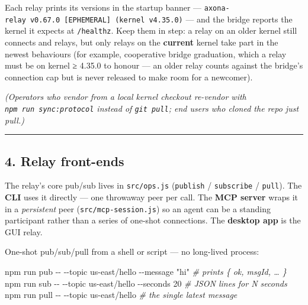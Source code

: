 \documentclass[
  nobib]{tufte-handout}
\newenvironment{Shaded}{}{}
\newcommand{\AttributeTok}[1]{\textcolor[rgb]{0.49,0.56,0.16}{#1}}
\newcommand{\CommentTok}[1]{\textcolor[rgb]{0.38,0.63,0.69}{\textit{#1}}}
\newcommand{\ExtensionTok}[1]{#1}
\newcommand{\NormalTok}[1]{#1}
\newcommand{\StringTok}[1]{\textcolor[rgb]{0.25,0.44,0.63}{#1}}
\renewcommand{\subsubsection}[1]{\medskip\par\noindent{\normalsize\bfseries #1}\par\nobreak\smallskip}
\begin{document}
Each relay prints its versions in the startup banner ---
\texttt{axona-relay\ v0.67.0\ {[}EPHEMERAL{]}\ (kernel\ v4.35.0)} ---
and the bridge reports the kernel it expects at \texttt{/healthz}. Keep
them in step: a relay on an older kernel still connects and relays, but
only relays on the \textbf{current} kernel take part in the newest
behaviours (for example, cooperative bridge graduation, which a relay
must be on kernel ≥ 4.35.0 to honour --- an older relay counts against
the bridge's connection cap but is never released to make room for a
newcomer).

\emph{(Operators who vendor from a local kernel checkout re-vendor with
\texttt{npm\ run\ sync:protocol} instead of \texttt{git\ pull}; end
users who cloned the repo just pull.)}

\begin{center}\rule{0.5\linewidth}{0.5pt}\end{center}

\subsection{4. Relay front-ends}\label{relay-front-ends}

The relay's core pub/sub lives in \texttt{src/ops.js} (\texttt{publish}
/ \texttt{subscribe} / \texttt{pull}). The \textbf{CLI} uses it directly
--- one throwaway peer per call. The \textbf{MCP server} wraps it in a
\emph{persistent} peer (\texttt{src/mcp-session.js}) so an agent can be
a standing participant rather than a series of one-shot connections. The
\textbf{desktop app} is the GUI relay.

\subsubsection{\texorpdfstring{4a. CLI
(\texttt{axona-cli})}{4a. CLI (axona-cli)}}\label{a.-cli-axona-cli}

One-shot pub/sub/pull from a shell or script --- no long-lived process:

\begin{Shaded}
\begin{Highlighting}[]
\ExtensionTok{npm}\NormalTok{ run pub  }\AttributeTok{{-}{-}} \AttributeTok{{-}{-}topic}\NormalTok{ us{-}east/hello }\AttributeTok{{-}{-}message} \StringTok{"hi"}          \CommentTok{\# prints \{ ok, msgId, … \}}
\ExtensionTok{npm}\NormalTok{ run sub  }\AttributeTok{{-}{-}} \AttributeTok{{-}{-}topic}\NormalTok{ us{-}east/hello }\AttributeTok{{-}{-}seconds}\NormalTok{ 20            }\CommentTok{\# JSON lines for N seconds}
\ExtensionTok{npm}\NormalTok{ run pull }\AttributeTok{{-}{-}} \AttributeTok{{-}{-}topic}\NormalTok{ us{-}east/hello                         }\CommentTok{\# the single latest message}
\end{Highlighting}
\end{Shaded}
\end{document}
